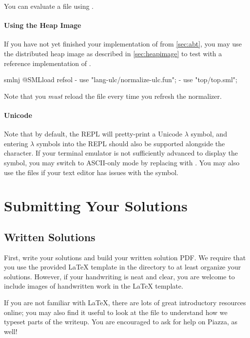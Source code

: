 \documentclass[11pt]{article}
\begin{document}
You can evaluate a file using .

\paragraph{Using the Heap Image}
If you have not yet finished your implementation of  from \cref{sec:abt}, you may use the distributed heap image as described in \cref{sec:heapimage} to test with a reference implementation of .
\begin{codeblock}
  smlnj @SMLload refsol
  - use "lang-ulc/normalize-ulc.fun";
  - use "top/top.sml";
\end{codeblock}
Note that you \emph{must} reload the  file every time you refresh the normalizer.

\paragraph{Unicode}
Note that by default, the REPL will pretty-print a Unicode \colorbox{background_color}{$\lambda$} symbol, and entering \colorbox{background_color}{$\lambda$} symbols into the REPL should also be supported alongside the \code{\\} character.
If your terminal emulator is not sufficiently advanced to display the symbol, you may switch to ASCII-only mode by replacing  with .
You may also use the  files if your text editor has issues with the symbol.


\appendix

\section{Submitting Your Solutions}\label{sec:submitting}

\subsection{Written Solutions}

First, write your solutions and build your written solution PDF.
We require that you use the provided \LaTeX{} template in the  directory to at least organize your solutions.
However, if your handwriting is neat and clear, you are welcome to include images of handwritten work in the \LaTeX{} template.

If you are not familiar with \LaTeX{}, there are lots of great introductory resources online; you may also find it useful to look at the  file to understand how we typeset parts of the writeup.
You are encouraged to ask for help on Piazza, as well!
\end{document}
